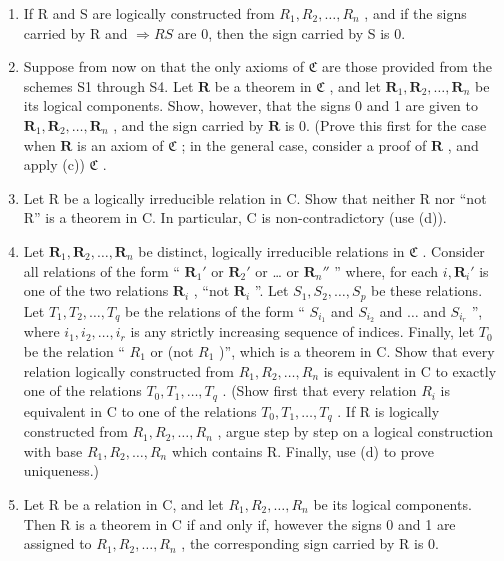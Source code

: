 \begin{enumerate}
\def\labelenumi{(\alph{enumi})}
\setcounter{enumi}{2}
\item
  If R and S are logically constructed from \(R_{1}, R_{2}, \ldots, R_{n}\) , and if the signs carried by R and \(\Longrightarrow RS\) are 0, then the sign carried by S is 0.
\item
  Suppose from now on that the only axioms of \(\mathfrak{C}\) are those provided from the schemes S1 through S4. Let \(\pmb{R}\) be a theorem in \(\mathfrak{C}\) , and let \(\pmb{R}_1, \pmb{R}_2, \ldots, \pmb{R}_n\) be its logical components. Show, however, that the signs 0 and 1 are given to \(\pmb{R}_1, \pmb{R}_2, \ldots, \pmb{R}_n\) , and the sign carried by \(\pmb{R}\) is 0. (Prove this first for the case when \(\pmb{R}\) is an axiom of \(\mathfrak{C}\) ; in the general case, consider a proof of \(\pmb{R}\) , and apply (c)) \(\mathfrak{C}\) .
\item
  Let R be a logically irreducible relation in C. Show that neither R nor ``not R'' is a theorem in C. In particular, C is non-contradictory (use (d)).
\item
  Let \(\mathbf{R}_1, \mathbf{R}_2, \ldots, \mathbf{R}_n\) be distinct, logically irreducible relations in \(\mathfrak{C}\) . Consider all relations of the form `` \(\mathbf{R}_1'\) or \(\mathbf{R}_2'\) or \ldots{} or \(\mathbf{R}_n''\) '' where, for each \(i, \mathbf{R}_i'\) is one of the two relations \(\mathbf{R}_i\) , ``not \(\mathbf{R}_i\) ''. Let \(S_1, S_2, \ldots, S_p\) be these relations. Let \(T_1, T_2, \ldots, T_q\) be the relations of the form `` \(S_{i_{1}}\) and \(S_{i_{2}}\) and \(\ldots\) and \(S_{i_{r}}\) '', where \(i_{1}, i_{2}, \ldots, i_{r}\) is any strictly increasing sequence of indices. Finally, let \(T_{0}\) be the relation `` \(R_{1}\) or (not \(R_{1}\) )'', which is a theorem in C. Show that every relation logically constructed from \(R_{1}, R_{2}, \ldots, R_{n}\) is equivalent in C to exactly one of the relations \(T_{0}, T_{1}, \ldots, T_{q}\) . (Show first that every relation \(R_{i}\) is equivalent in C to one of the relations \(T_{0}, T_{1}, \ldots, T_{q}\) . If R is logically constructed from \(R_{1}, R_{2}, \ldots, R_{n}\) , argue step by step on a logical construction with base \(R_{1}, R_{2}, \ldots, R_{n}\) which contains R. Finally, use (d) to prove uniqueness.)
\item
  Let R be a relation in C, and let \(R_{1}, R_{2}, \ldots, R_{n}\) be its logical components. Then R is a theorem in C if and only if, however the signs 0 and 1 are assigned to \(R_{1}, R_{2}, \ldots, R_{n}\) , the corresponding sign carried by R is 0.
\end{enumerate}

